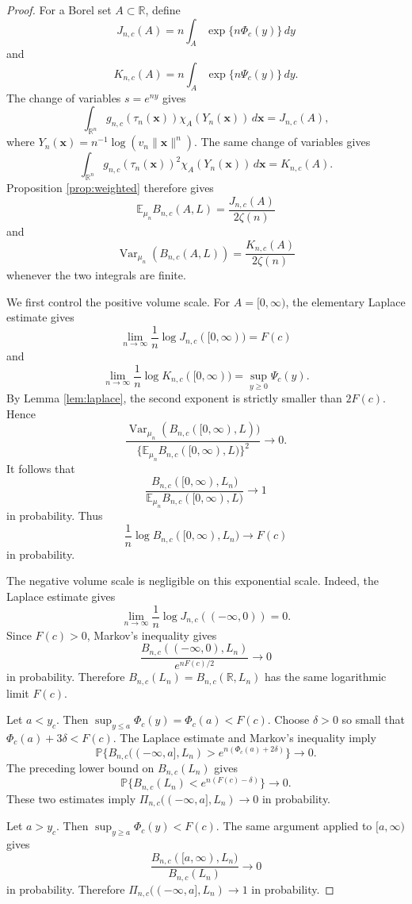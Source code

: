 \documentclass[a4paper,12pt]{article}
\theoremstyle{definition}
\theoremstyle{remark}
\newcommand{\re}{\mathbb R}
\newcommand{\ex}{\mathbb E}
\newcommand{\pr}{\mathbb P}
\newcommand{\Var}{\operatorname{Var}}
\begin{document}
\begin{proof}
For a Borel set $A\subset\re$, define
$$
J_{n,c}(A)=n\int_A\exp\{n\Phi_c(y)\}\,dy
$$
and
$$
K_{n,c}(A)=n\int_A\exp\{n\Psi_c(y)\}\,dy.
$$
The change of variables $s=e^{ny}$ gives
$$
\int_{\re^n}g_{n,c}(\tau_n(\bm x))\chi_A(Y_n(\bm x))\,d\bm x
=
J_{n,c}(A),
$$
where $Y_n(\bm x)=n^{-1}\log(v_n\|\bm x\|^n)$.
The same change of variables gives
$$
\int_{\re^n}g_{n,c}(\tau_n(\bm x))^2\chi_A(Y_n(\bm x))\,d\bm x
=
K_{n,c}(A).
$$
Proposition \ref{prop:weighted} therefore gives
$$
\ex_{\mu_n}B_{n,c}(A,L)=\frac{J_{n,c}(A)}{2\zeta(n)}
$$
and
$$
\Var_{\mu_n}(B_{n,c}(A,L))=\frac{K_{n,c}(A)}{2\zeta(n)}
$$
whenever the two integrals are finite.

We first control the positive volume scale.
For $A=[0,\infty)$, the elementary Laplace estimate gives
$$
\lim_{n\to\infty}\frac{1}{n}\log J_{n,c}([0,\infty))=F(c)
$$
and
$$
\lim_{n\to\infty}\frac{1}{n}\log K_{n,c}([0,\infty))=
\sup_{y\ge0}\Psi_c(y).
$$
By Lemma \ref{lem:laplace}, the second exponent is strictly smaller than $2F(c)$.
Hence
$$
\frac{\Var_{\mu_n}(B_{n,c}([0,\infty),L))}
{\{\ex_{\mu_n}B_{n,c}([0,\infty),L)\}^2}\to0.
$$
It follows that
$$
\frac{B_{n,c}([0,\infty),L_n)}
{\ex_{\mu_n}B_{n,c}([0,\infty),L)}\to1
$$
in probability.
Thus
$$
\frac{1}{n}\log B_{n,c}([0,\infty),L_n)\to F(c)
$$
in probability.

The negative volume scale is negligible on this exponential scale.
Indeed, the Laplace estimate gives
$$
\lim_{n\to\infty}\frac{1}{n}\log J_{n,c}((-\infty,0))=0.
$$
Since $F(c)>0$, Markov's inequality gives
$$
\frac{B_{n,c}((-\infty,0),L_n)}{e^{nF(c)/2}}\to0
$$
in probability.
Therefore $B_{n,c}(L_n)=B_{n,c}(\re,L_n)$ has the same logarithmic limit $F(c)$.

Let $a<y_c$.
Then $\sup_{y\le a}\Phi_c(y)=\Phi_c(a)<F(c)$.
Choose $\delta>0$ so small that $\Phi_c(a)+3\delta<F(c)$.
The Laplace estimate and Markov's inequality imply
$$
\pr\{B_{n,c}((-\infty,a],L_n)>e^{n(\Phi_c(a)+2\delta)}\}\to0.
$$
The preceding lower bound on $B_{n,c}(L_n)$ gives
$$
\pr\{B_{n,c}(L_n)<e^{n(F(c)-\delta)}\}\to0.
$$
These two estimates imply $\Pi_{n,c}((-\infty,a],L_n)\to0$ in probability.

Let $a>y_c$.
Then $\sup_{y\ge a}\Phi_c(y)<F(c)$.
The same argument applied to $[a,\infty)$ gives
$$
\frac{B_{n,c}([a,\infty),L_n)}{B_{n,c}(L_n)}\to0
$$
in probability.
Therefore $\Pi_{n,c}((-\infty,a],L_n)\to1$ in probability.
\end{proof}
\end{document}
